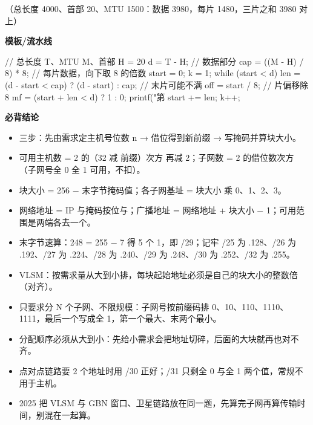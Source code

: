 \documentclass[10pt,a4paper]{ctexart}
\begin{document}
（总长度 4000、首部 20、MTU 1500：数据 3980，每片 1480，三片之和 3980 对上）

\textbf{模板/流水线}

\begin{codebox}
// 总长度 T、MTU M、首部 H = 20
d   = T - H;                       // 数据部分
cap = ((M - H) / 8) * 8;           // 每片数据，向下取 8 的倍数
start = 0; k = 1;
while (start < d) {
    len = (d - start < cap) ? (d - start) : cap;   // 末片可能不满
    off = start / 8;                               // 片偏移除 8
    mf  = (start + len < d) ? 1 : 0;
    printf("第%
    start += len; k++;
}
\end{codebox}




\textbf{必背结论}

\begin{itemize}

\item 三步：先由需求定主机号位数 n → 借位得到新前缀 → 写掩码并算块大小。

\item 可用主机数 = 2 的（32 减 前缀）次方 再减 2；子网数 = 2 的借位数次方（子网号全 0 全 1 可用，不扣）。

\item 块大小 = 256 − 末字节掩码值；各子网基址 = 块大小 乘 0、1、2、3。

\item 网络地址 = IP 与掩码按位与；广播地址 = 网络地址 + 块大小 − 1；可用范围是两端各去一个。

\item 末字节速算：248 = 255 − 7 得 5 个 1，即 /29；记牢 /25 为 .128、/26 为 .192、/27 为 .224、/28 为 .240、/29 为 .248、/30 为 .252、/32 为 .255。

\item VLSM：按需求量从大到小排，每块起始地址必须是自己的块大小的整数倍（对齐）。

\item 只要求分 N 个子网、不限规模：子网号按前缀码排 0、10、110、1110、1111，最后一个写成全 1，第一个最大、末两个最小。

\item 分配顺序必须从大到小：先给小需求会把地址切碎，后面的大块就再也对不齐。

\item 点对点链路要 2 个地址时用 /30 正好；/31 只剩全 0 与全 1 两个值，常规不用于主机。

\item 2025 把 VLSM 与 GBN 窗口、卫星链路放在同一题，先算完子网再算传输时间，别混在一起算。

\end{itemize}
\end{document}
